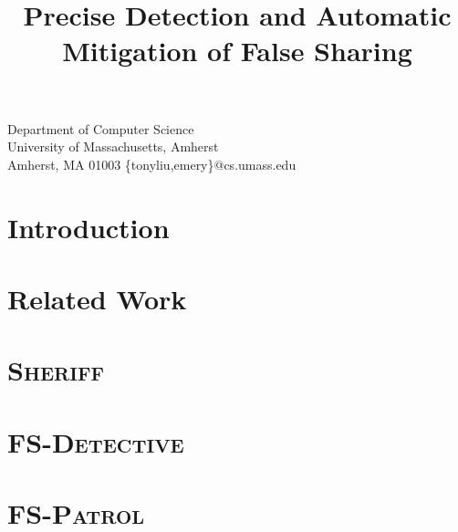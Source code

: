 \documentclass[10pt,preprint]{sigplanconf} %
\newcommand{\sheriff}{\textsc{Sheriff}}
\newcommand{\sheriffprotect}{\textsc{FS-Patrol}}
\newcommand{\sheriffdetect}{\textsc{FS-Detective}}
\begin{document}

\title{Precise Detection and Automatic Mitigation of False Sharing}

{Department of Computer Science \\
University of Massachusetts, Amherst \\
Amherst, MA 01003}
{\{tonyliu,emery\}@cs.umass.edu}

\maketitle

\begin{abstract}

\end{abstract}




\section{Introduction}


\section{Related Work}


\section{\sheriff{}}


\section{\sheriffdetect{}}


\section{\sheriffprotect{}}


%
\end{document}
